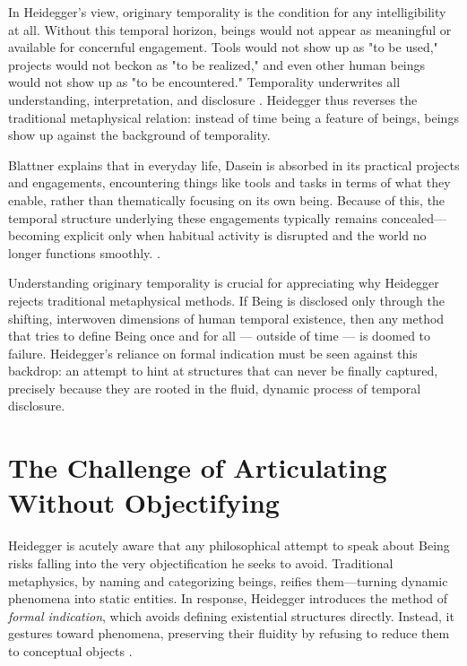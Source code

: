\documentclass{article}
\begin{document}
In Heidegger's view, originary temporality is the condition for any intelligibility at all. Without this temporal horizon, beings would not appear as meaningful or available for concernful engagement. Tools would not show up as "to be used," projects would not beckon as "to be realized," and even other human beings would not show up as "to be encountered." Temporality underwrites all understanding, interpretation, and disclosure \parencite[pp.~645--650]{heidegger1962}. Heidegger thus reverses the traditional metaphysical relation: instead of time being a feature of beings, beings show up against the background of temporality.

Blattner explains that in everyday life, Dasein is absorbed in its practical projects and engagements, encountering things like tools and tasks in terms of what they enable, rather than thematically focusing on its own being. Because of this, the temporal structure underlying these engagements typically remains concealed—becoming explicit only when habitual activity is disrupted and the world no longer functions smoothly. \parencite[p.~314]{blattner2007}.

Understanding originary temporality is crucial for appreciating why Heidegger rejects traditional metaphysical methods. If Being is disclosed only through the shifting, interwoven dimensions of human temporal existence, then any method that tries to define Being once and for all --- outside of time --- is doomed to failure. Heidegger's reliance on formal indication must be seen against this backdrop: an attempt to hint at structures that can never be finally captured, precisely because they are rooted in the fluid, dynamic process of temporal disclosure.

\section*{The Challenge of Articulating \\ Without Objectifying}

Heidegger is acutely aware that any philosophical attempt to speak about Being risks falling into the very objectification he seeks to avoid. Traditional metaphysics, by naming and categorizing beings, reifies them—turning dynamic phenomena into static entities. In response, Heidegger introduces the method of \textit{formal indication}, which avoids defining existential structures directly. Instead, it gestures toward phenomena, preserving their fluidity by refusing to reduce them to conceptual objects \parencite[pp.~781–784]{dahlstrom1994}.
\end{document}
